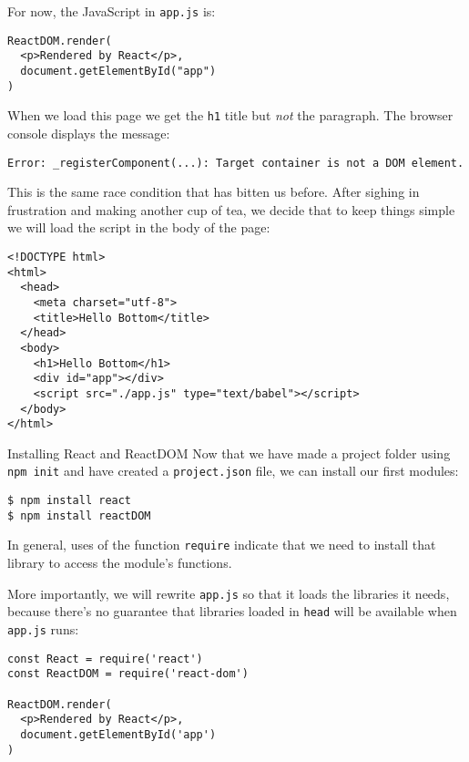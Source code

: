 \noindent
For now,
the JavaScript in \texttt{app.js} is:

\begin{verbatim}
ReactDOM.render(
  <p>Rendered by React</p>,
  document.getElementById("app")
)
\end{verbatim}

When we load this page we get the \texttt{h1} title but \emph{not} the paragraph.
The browser console displays the message:

\begin{verbatim}
Error: _registerComponent(...): Target container is not a DOM element.
\end{verbatim}

This is the same race condition that has bitten us before.
After sighing in frustration and making another cup of tea,
we decide that
to keep things simple
we will load the script in the body of the page:

\begin{verbatim}
<!DOCTYPE html>
<html>
  <head>
    <meta charset="utf-8">
    <title>Hello Bottom</title>
  </head>
  <body>
    <h1>Hello Bottom</h1>
    <div id="app"></div>
    <script src="./app.js" type="text/babel"></script>
  </body>
</html>
\end{verbatim}

\begin{aside}{Installing React and ReactDOM}
  Now that we have made a project folder using \texttt{npm init}
  and have created a \texttt{project.json} file,
  we can install our first modules:

\begin{verbatim}
$ npm install react
$ npm install reactDOM
\end{verbatim}

  In general,
  uses of the function \texttt{require} indicate that
  we need to install that library to access the module's functions.
\end{aside}

More importantly,
we will rewrite \texttt{app.js} so that it loads the libraries it needs,
because there's no guarantee that libraries loaded in \texttt{head} will be available when \texttt{app.js} runs:

\begin{verbatim}
const React = require('react')
const ReactDOM = require('react-dom')

ReactDOM.render(
  <p>Rendered by React</p>,
  document.getElementById('app')
)
\end{verbatim}

